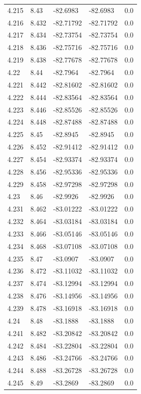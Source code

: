 \begin{tabular}{lllll}
4.215 & 8.43 & -82.6983 & -82.6983 & 0.0 \\
4.216 & 8.432 & -82.71792 & -82.71792 & 0.0 \\
4.217 & 8.434 & -82.73754 & -82.73754 & 0.0 \\
4.218 & 8.436 & -82.75716 & -82.75716 & 0.0 \\
4.219 & 8.438 & -82.77678 & -82.77678 & 0.0 \\
4.22 & 8.44 & -82.7964 & -82.7964 & 0.0 \\
4.221 & 8.442 & -82.81602 & -82.81602 & 0.0 \\
4.222 & 8.444 & -82.83564 & -82.83564 & 0.0 \\
4.223 & 8.446 & -82.85526 & -82.85526 & 0.0 \\
4.224 & 8.448 & -82.87488 & -82.87488 & 0.0 \\
4.225 & 8.45 & -82.8945 & -82.8945 & 0.0 \\
4.226 & 8.452 & -82.91412 & -82.91412 & 0.0 \\
4.227 & 8.454 & -82.93374 & -82.93374 & 0.0 \\
4.228 & 8.456 & -82.95336 & -82.95336 & 0.0 \\
4.229 & 8.458 & -82.97298 & -82.97298 & 0.0 \\
4.23 & 8.46 & -82.9926 & -82.9926 & 0.0 \\
4.231 & 8.462 & -83.01222 & -83.01222 & 0.0 \\
4.232 & 8.464 & -83.03184 & -83.03184 & 0.0 \\
4.233 & 8.466 & -83.05146 & -83.05146 & 0.0 \\
4.234 & 8.468 & -83.07108 & -83.07108 & 0.0 \\
4.235 & 8.47 & -83.0907 & -83.0907 & 0.0 \\
4.236 & 8.472 & -83.11032 & -83.11032 & 0.0 \\
4.237 & 8.474 & -83.12994 & -83.12994 & 0.0 \\
4.238 & 8.476 & -83.14956 & -83.14956 & 0.0 \\
4.239 & 8.478 & -83.16918 & -83.16918 & 0.0 \\
4.24 & 8.48 & -83.1888 & -83.1888 & 0.0 \\
4.241 & 8.482 & -83.20842 & -83.20842 & 0.0 \\
4.242 & 8.484 & -83.22804 & -83.22804 & 0.0 \\
4.243 & 8.486 & -83.24766 & -83.24766 & 0.0 \\
4.244 & 8.488 & -83.26728 & -83.26728 & 0.0 \\
4.245 & 8.49 & -83.2869 & -83.2869 & 0.0 \\

\end{tabular}
